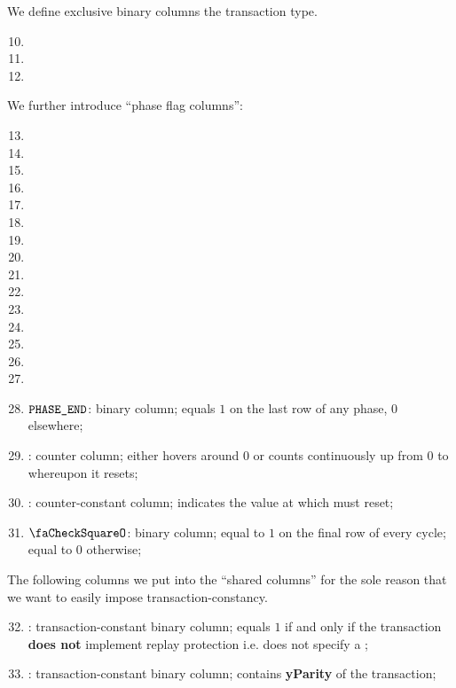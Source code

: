 We define exclusive binary columns the transaction type.
\begin{multicols}{3}
    \begin{enumerate}
	\setcounter{enumi}{9}
	\item \typeZeroTx{}
	\item \typeOneTx{}
	\item \typeTwoTx{}
    \end{enumerate}
\end{multicols}
We further introduce ``phase flag columns'':
\begin{multicols}{3}
    \begin{enumerate}[resume]
	\setcounter{enumi}{12}
	\item \phaseRlpPrefix{}
	\item \phaseChainId{}
	\item \phaseNonce{}
	\item \phaseGasPrice{}
	\item \phaseGasLimit{}
	\item \phaseTo{}
	\item \phaseValue{}
	\item \phaseData{}
	\item \phaseAccessList{}
	\item \phaseBeta{}
	\item \phaseMaxPriorityFeePerGas{}
	\item \phaseMaxFeePerGas{}
	\item \phaseY{}
	\item \phaseR{}
	\item \phaseS{}
    \end{enumerate}
\end{multicols}
\begin{enumerate}
	\setcounter{enumi}{27}
    \item $\texttt{PHASE\_END}$:
	binary column; equals $1$ on the last row of any phase, $0$ elsewhere;
    \item \ct{}:
	counter column; 
	either hovers around $0$ or counts continuously up from $0$ to \maxCt{} whereupon it resets;
    \item \maxCt:
	counter-constant column;
	indicates the value at which \ct{} must reset;
    \item $\done$:
	binary column; equal to $1$ on the final row of every \ct{} cycle; equal to $0$ otherwise;
\end{enumerate}
The following columns we put into the ``shared columns'' for the sole reason that we want to easily impose transaction-constancy.
\begin{enumerate}
	\setcounter{enumi}{31}
        \item 
	    \rlpTxnCommonColumnReplayProtection{}:
	    transaction-constant binary column;
	    equals $1$ if and only if the transaction \textbf{does not} implement replay protection i.e.
	    does not specify a \chainId{};
	\item
	    \rlpTxnCommonColumnYparity{}:
	    transaction-constant binary column;
	    contains \textbf{yParity} of the transaction;
\end{enumerate}
